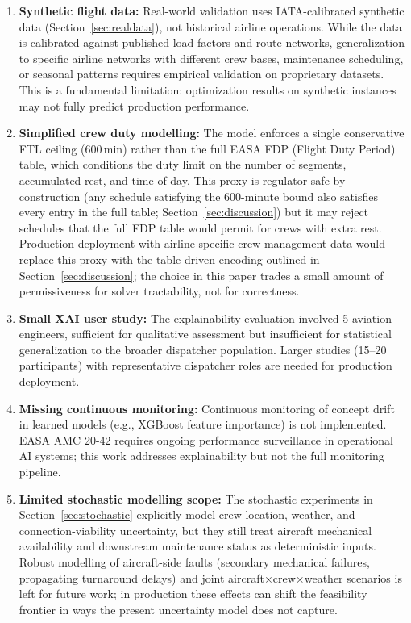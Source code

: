 \documentclass[12pt,number]{elsarticle}
\begin{document}
\begin{enumerate}
    \item \textbf{Synthetic flight data:} Real-world validation uses IATA-calibrated synthetic data (Section~\ref{sec:realdata}), not historical airline operations. While the data is calibrated against published load factors and route networks, generalization to specific airline networks with different crew bases, maintenance scheduling, or seasonal patterns requires empirical validation on proprietary datasets. This is a fundamental limitation: optimization results on synthetic instances may not fully predict production performance.

    \item \textbf{Simplified crew duty modelling:} The model enforces a single conservative FTL ceiling (600\,min) rather than the full EASA FDP (Flight Duty Period) table, which conditions the duty limit on the number of segments, accumulated rest, and time of day. This proxy is regulator-safe by construction (any schedule satisfying the 600-minute bound also satisfies every entry in the full table; Section~\ref{sec:discussion}) but it may reject schedules that the full FDP table would permit for crews with extra rest. Production deployment with airline-specific crew management data would replace this proxy with the table-driven encoding outlined in Section~\ref{sec:discussion}; the choice in this paper trades a small amount of permissiveness for solver tractability, not for correctness.

    \item \textbf{Small XAI user study:} The explainability evaluation involved 5 aviation engineers, sufficient for qualitative assessment but insufficient for statistical generalization to the broader dispatcher population. Larger studies (15--20 participants) with representative dispatcher roles are needed for production deployment.

    \item \textbf{Missing continuous monitoring:} Continuous monitoring of concept drift in learned models (e.g., XGBoost feature importance) is not implemented. EASA AMC 20-42 requires ongoing performance surveillance in operational AI systems; this work addresses explainability but not the full monitoring pipeline.

    \item \textbf{Limited stochastic modelling scope:} The stochastic experiments in Section~\ref{sec:stochastic} explicitly model crew location, weather, and connection-viability uncertainty, but they still treat aircraft mechanical availability and downstream maintenance status as deterministic inputs. Robust modelling of aircraft-side faults (secondary mechanical failures, propagating turnaround delays) and joint aircraft$\times$crew$\times$weather scenarios is left for future work; in production these effects can shift the feasibility frontier in ways the present uncertainty model does not capture.


\end{enumerate}
\end{document}
